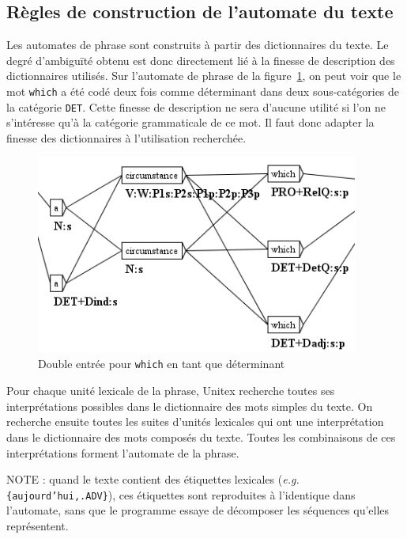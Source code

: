 \subsection{Règles de construction de l’automate du texte}
Les automates de phrase sont construits à partir des dictionnaires du texte. Le degré
d’ambiguïté obtenu est donc directement lié à la finesse de description des dictionnaires utilisés.
Sur l’automate de phrase de la figure~\ref{fig-ambiguity-of-which}, on peut voir que le mot
\verb+which+ a été codé deux fois comme déterminant dans deux sous-catégories de la catégorie
 \verb+DET+. Cette finesse de description ne sera d’aucune utilité si l’on ne s’intéresse qu’à la
 catégorie grammaticale de ce mot. Il faut donc adapter la finesse des dictionnaires à l’utilisation
 recherchée.


\begin{figure}[!ht]
\begin{center}
\includegraphics[width=10.6cm]{resources/img/fig7-3.png}
\caption{Double entrée pour \texttt{which} en tant que déterminant\label{fig-ambiguity-of-which}}
\end{center}
\end{figure}

\bigskip
\noindent Pour chaque unité lexicale de la phrase, Unitex recherche toutes ses interprétations
possibles dans le dictionnaire des mots simples du texte. On recherche ensuite toutes les suites
d’unités lexicales qui ont une interprétation dans le dictionnaire des mots composés du
texte. Toutes les combinaisons de ces interprétations forment l’automate de la phrase.


\bigskip
\noindent NOTE : quand le texte contient des étiquettes lexicales (\textit{e.g.}
 \verb${aujourd’hui,.ADV}$), ces étiquettes sont reproduites à l’identique dans l’automate, 
sans que le programme essaye de décomposer les séquences qu’elles représentent.

